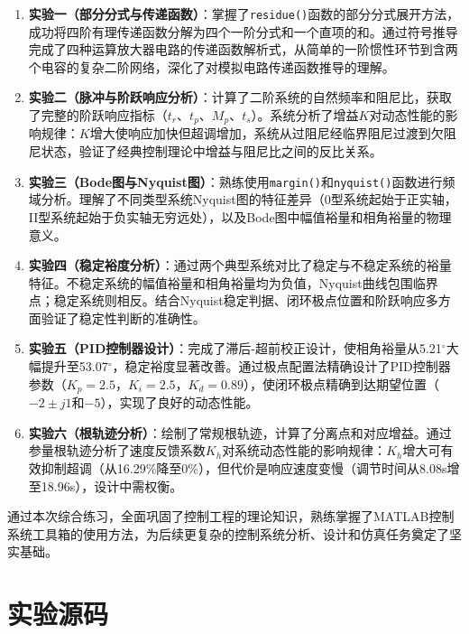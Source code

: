 \documentclass{../common/SCNU_Experimental_Report}
\begin{document}
\begin{enumerate}
    \item \textbf{实验一（部分分式与传递函数）}：掌握了\texttt{residue()}函数的部分分式展开方法，成功将四阶有理传递函数分解为四个一阶分式和一个直项的和。通过符号推导完成了四种运算放大器电路的传递函数解析式，从简单的一阶惯性环节到含两个电容的复杂二阶网络，深化了对模拟电路传递函数推导的理解。

    \item \textbf{实验二（脉冲与阶跃响应分析）}：计算了二阶系统的自然频率和阻尼比，获取了完整的阶跃响应指标（$t_r$、$t_p$、$M_p$、$t_s$）。系统分析了增益$K$对动态性能的影响规律：$K$增大使响应加快但超调增加，系统从过阻尼经临界阻尼过渡到欠阻尼状态，验证了经典控制理论中增益与阻尼比之间的反比关系。

    \item \textbf{实验三（Bode图与Nyquist图）}：熟练使用\texttt{margin()}和\texttt{nyquist()}函数进行频域分析。理解了不同类型系统Nyquist图的特征差异（0型系统起始于正实轴，II型系统起始于负实轴无穷远处），以及Bode图中幅值裕量和相角裕量的物理意义。

    \item \textbf{实验四（稳定裕度分析）}：通过两个典型系统对比了稳定与不稳定系统的裕量特征。不稳定系统的幅值裕量和相角裕量均为负值，Nyquist曲线包围临界点；稳定系统则相反。结合Nyquist稳定判据、闭环极点位置和阶跃响应多方面验证了稳定性判断的准确性。

    \item \textbf{实验五（PID控制器设计）}：完成了滞后-超前校正设计，使相角裕量从5.21$^\circ$大幅提升至53.07$^\circ$，稳定裕度显著改善。通过极点配置法精确设计了PID控制器参数（$K_p=2.5$，$K_i=2.5$，$K_d=0.89$），使闭环极点精确到达期望位置（$-2\pm j1$和$-5$），实现了良好的动态性能。

    \item \textbf{实验六（根轨迹分析）}：绘制了常规根轨迹，计算了分离点和对应增益。通过参量根轨迹分析了速度反馈系数$K_h$对系统动态性能的影响规律：$K_h$增大可有效抑制超调（从16.29\%降至0\%），但代价是响应速度变慢（调节时间从8.08s增至18.96s），设计中需权衡。

\end{enumerate}

通过本次综合练习，全面巩固了控制工程的理论知识，熟练掌握了MATLAB控制系统工具箱的使用方法，为后续更复杂的控制系统分析、设计和仿真任务奠定了坚实基础。

\section{实验源码}
\end{document}
